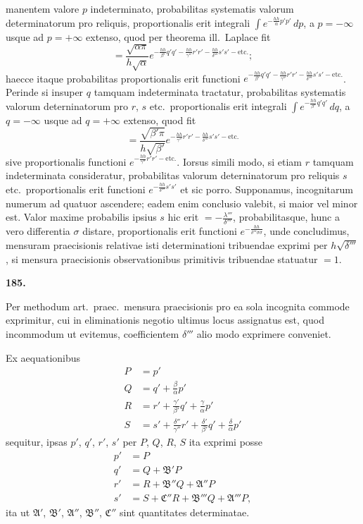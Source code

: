 \documentclass[11pt,a4paper]{article}
\begin{document}
manentem valore $p$ indeterminato, probabilitas systematis valorum determinatorum pro reliquis, proportionalis erit integrali $\int e^{-\frac{hh}{\alpha}p'p'} \, dp$, a $p = -\infty$ usque ad $p = +\infty$ extenso, quod per theorema ill.\ Laplace fit
\[
= \frac{\sqrt{\alpha\pi}}{h\sqrt{\alpha}} e^{-\frac{hh}{\beta'}q'q' - \frac{hh}{\gamma''}r'r' - \frac{hh}{\delta'''}s's' - \text{etc.}};
\]
haecce itaque probabilitas proportionalis erit functioni $e^{-\frac{hh}{\beta'}q'q' - \frac{hh}{\gamma''}r'r' - \frac{hh}{\delta'''}s's' - \text{etc.}}$. Perinde si insuper $q$ tamquam indeterminata tractatur, probabilitas systematis valorum deterninatorum pro $r$, $s$ etc.\ proportionalis erit integrali $\int e^{-\frac{hh}{\beta'}q'q'} \, dq$, a $q = -\infty$ usque ad $q = +\infty$ extenso, quod fit
\[
= \frac{\sqrt{\beta'\pi}}{h\sqrt{\beta'}} e^{-\frac{hh}{\gamma''}r'r' - \frac{hh}{\delta'''}s's' - \text{etc.}}
\]
sive proportionalis functioni $e^{-\frac{hh}{\gamma''}r'r' - \text{etc.}}$. Iorsus simili modo, si etiam $r$ tamquam indeterminata consideratur, probabilitas valorum deterninatorum pro reliquis $s$ etc.\ proportionalis erit functioni $e^{-\frac{hh}{\delta'''}s's'}$ et sic porro. Supponamus, incognitarum numerum ad quatuor ascendere; eadem enim conclusio valebit, si maior vel minor est. Valor maxime probabilis ipsius $s$ hic erit $= -\frac{\lambda'''}{\delta'''}$, probabilitasque, hunc a vero differentia $\sigma$ distare, proportionalis erit functioni $e^{-\frac{hh}{\delta'''\sigma\sigma}}$, unde concludimus, mensuram praecisionis relativae isti determinationi tribuendae exprimi per $h\sqrt{\delta'''}$, si mensura praecisionis observationibus primitivis tribuendae statuatur $= 1$.

\newpage
\setcounter{page}{257}

\noindent\textbf{185.}

Per methodum art.\ praec.\ mensura praecisionis pro ea sola incognita commode exprimitur, cui in eliminationis negotio ultimus locus assignatus est, quod incommodum ut evitemus, coefficientem $\delta'''$ alio modo exprimere conveniet.

Ex aequationibus
\begin{align*}
P &= p' \\
Q &= q' + \frac{\beta}{\alpha}p' \\
R &= r' + \frac{\gamma'}{\beta'}q' + \frac{\gamma}{\alpha}p' \\
S &= s' + \frac{\delta''}{\gamma''}r' + \frac{\delta'}{\beta'}q' + \frac{\delta}{\alpha}p'
\end{align*}
sequitur, ipsas $p'$, $q'$, $r'$, $s'$ per $P$, $Q$, $R$, $S$ ita exprimi posse
\begin{align*}
p' &= P \\
q' &= Q + \mathfrak{B}'P \\
r' &= R + \mathfrak{B}''Q + \mathfrak{A}''P \\
s' &= S + \mathfrak{C}''R + \mathfrak{B}'''Q + \mathfrak{A}'''P,
\end{align*}
ita ut $\mathfrak{A}'$, $\mathfrak{B}'$, $\mathfrak{A}''$, $\mathfrak{B}''$, $\mathfrak{C}''$ sint quantitates determinatae.
\end{document}
